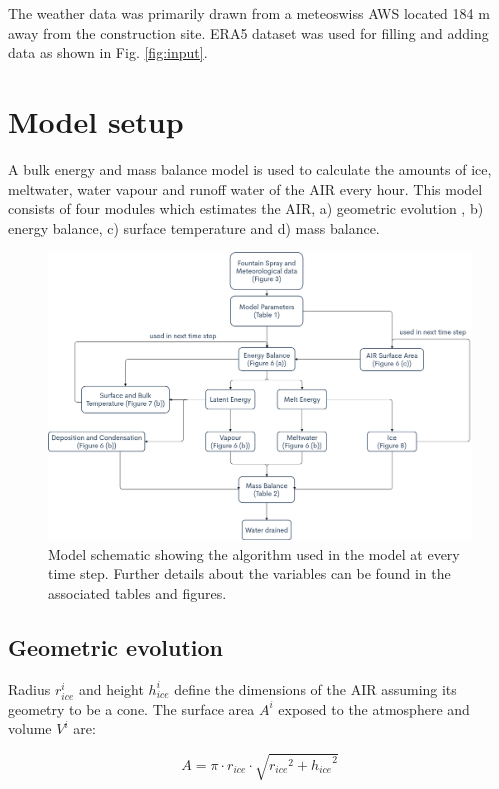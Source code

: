 \documentclass[utf8]{frontiersSCNS} %
\begin{document}
The weather data was primarily drawn from a meteoswiss AWS located 184 m away from the construction site. ERA5 dataset
was used for filling and adding data as shown in Fig. \ref{fig:input}. 

\section{Model setup}

A bulk energy and mass balance model is used to calculate the amounts of ice, meltwater, water vapour and runoff water
of the AIR every hour. This model consists of four modules which estimates the AIR, a) geometric evolution , b) energy
balance, c) surface temperature and d) mass balance. 

  \begin{figure} \begin{center} \includegraphics[width=15 cm]{Figures/Figure_4.jpg} \end{center} \caption{Model
schematic showing the algorithm used in the model at every time step. Further details about the variables can be
found in the associated tables and figures.} \label{fig:schema} \end{figure}

\subsection{Geometric evolution}

Radius $r_{ice}^i$ and height $h_{ice}^i$ define the dimensions of the AIR assuming its geometry to be a cone. The
surface area $A^i$ exposed to the atmosphere and volume $V^i$ are:

\begin{equation} A = \pi \cdot r_{ice} \cdot \sqrt{{r_{ice}}^2 + {h_{ice}}^ 2} \label{eqn:A} \end{equation}
\end{document}
